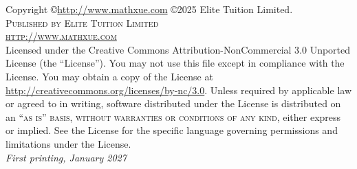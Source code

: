 \documentclass[11pt,fleqn,table]{book} %
\begin{document}
\noindent Copyright \copyright \href{http://www.mathxue.com/978-80-7340-097-2}{http://www.mathxue.com} \copyright 2025 Elite Tuition Limited.\\ %

\noindent \textsc{Published by Elite Tuition Limited}\\ %

\noindent \textsc{\href{http://www.mathxue.com/978-80-7340-097-2}{http://www.mathxue.com}}\\ %

\noindent Licensed under the Creative Commons Attribution-NonCommercial 3.0 Unported License (the ``License''). You may not use this file except in compliance with the License. You may obtain a copy of the License at \url{http://creativecommons.org/licenses/by-nc/3.0}. Unless required by applicable law or agreed to in writing, software distributed under the License is distributed on an \textsc{``as is'' basis, without warranties or conditions of any kind}, either express or implied. See the License for the specific language governing permissions and limitations under the License.\\ %

\noindent \textit{First printing, January 2027} %


\usechapterimagefalse %


\pagestyle{empty} %

\tableofcontents %

\cleardoublepage %

\pagestyle{fancy} %

\fancyhf{}
\renewcommand{\footrulewidth}{0pt}
\renewcommand{\headrulewidth}{0pt} 

\end{document}
